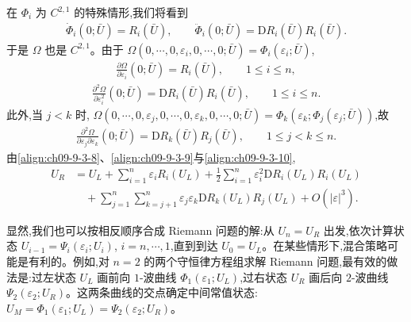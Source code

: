 \documentclass[../../main.tex]{subfiles}
\begin{document}
在 $\Phi_{i}$ 为 $C^{2,1}$ 的特殊情形,我们将看到
\begin{align}
\dot{\Phi}_{i}(0;\bar{U})=R_{i}(\bar{U}),\qquad\ddot{\Phi}_{i}(0;\bar{U})=\mathrm{D}R_{i}(\bar{U})R_{i}(\bar{U}).
\label{align:ch09-9-3-7}
\end{align}
于是 $\Omega$ 也是 $C^{2,1}$。由于 $\Omega(0,\cdots ,0,\varepsilon_{i},0,\cdots ,0;\bar{U})=\Phi_{i}(\varepsilon_{i};\bar{U})$,
\begin{align}
\frac{\partial\Omega}{\partial\varepsilon_{i}}(0;\bar{U})=R_{i}(\bar{U}),\qquad 1\leqslant i\leqslant n,
\label{align:ch09-9-3-8}
\end{align}
\begin{align}
\frac{\partial^{2}\Omega}{\partial\varepsilon_{i}^{2}}(0;\bar{U})=\mathrm{D}R_{i}(\bar{U})R_{i}(\bar{U}),\qquad 1\leqslant i\leqslant n.
\label{align:ch09-9-3-9}
\end{align}
此外,当 $j<k$ 时, $\Omega(0,\cdots ,0,\varepsilon_{j},0,\cdots ,0,\varepsilon_{k},0,\cdots ,0;\bar{U})=\Phi_{k}(\varepsilon_{k};\Phi_{j}(\varepsilon_{j};\bar{U}))$,故
\begin{align}
\frac{\partial^{2}\Omega}{\partial\varepsilon_{j}\partial\varepsilon_{k}}(0;\bar{U})=\mathrm{D}R_{k}(\bar{U})R_{j}(\bar{U}),\qquad 1\leqslant j<k\leqslant n.
\label{align:ch09-9-3-10}
\end{align}
由\eqref{align:ch09-9-3-8}、\eqref{align:ch09-9-3-9}与\eqref{align:ch09-9-3-10},
\begin{align}
U_{R}&=U_{L}+\sum_{i=1}^{n}\varepsilon_{i}R_{i}(U_{L})+\tfrac{1}{2}\sum_{i=1}^{n}\varepsilon_{i}^{2}\mathrm{D}R_{i}(U_{L})R_{i}(U_{L})
\nonumber\\
&\quad+\sum_{j=1}^{n}\sum_{k=j+1}^{n}\varepsilon_{j}\varepsilon_{k}\mathrm{D}R_{k}(U_{L})R_{j}(U_{L})+O(|\varepsilon|^{3}).
\label{align:ch09-9-3-11}
\end{align}

显然,我们也可以按相反顺序合成 Riemann 问题的解:从 $U_{n}=U_{R}$ 出发,依次计算状态 $U_{i-1}=\Psi_{i}(\varepsilon_{i};U_{i})$, $i=n,\cdots ,1$,直到到达 $U_{0}=U_{L}$。在某些情形下,混合策略可能是有利的。例如,对 $n=2$ 的两个守恒律方程组求解 Riemann 问题,最有效的做法是:过左状态 $U_{L}$ 画前向 $1$-波曲线 $\Phi_{1}(\varepsilon_{1};U_{L})$,过右状态 $U_{R}$ 画后向 $2$-波曲线 $\Psi_{2}(\varepsilon_{2};U_{R})$。这两条曲线的交点确定中间常值状态: $U_{M}=\Phi_{1}(\varepsilon_{1};U_{L})=\Psi_{2}(\varepsilon_{2};U_{R})$。
\end{document}
